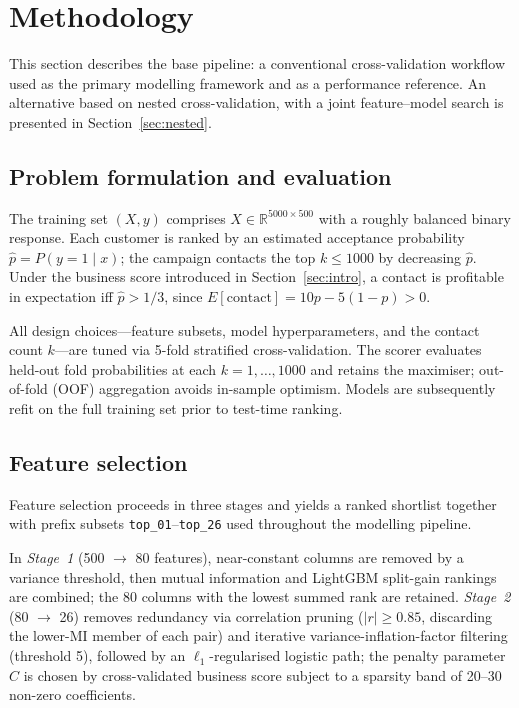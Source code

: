 \documentclass[cameraready]{Interspeech}
\begin{document}
\section{Methodology}

This section describes the base pipeline: a conventional cross-validation workflow used as the primary modelling framework and as a performance reference.
An alternative based on nested cross-validation, with a joint feature--model search is presented in Section~\ref{sec:nested}.

\subsection{Problem formulation and evaluation}
\label{sec:task}

The training set $(X, y)$ comprises $X \in \mathbb{R}^{5000 \times 500}$ with a roughly balanced binary response.
Each customer is ranked by an estimated acceptance probability $\hat{p} = P(y{=}1 \mid x)$; the campaign contacts the top $k \leq 1000$ by decreasing $\hat{p}$.
Under the business score introduced in Section~\ref{sec:intro}, a contact is profitable in expectation iff $\hat{p} > 1/3$, since $E[\text{contact}] = 10p - 5(1-p) > 0$.

All design choices---feature subsets, model hyperparameters, and the contact count $k$---are tuned via 5-fold stratified cross-validation.
The scorer evaluates held-out fold probabilities at each $k = 1, \ldots, 1000$ and retains the maximiser; out-of-fold (OOF) aggregation avoids in-sample optimism.
Models are subsequently refit on the full training set prior to test-time ranking.

\subsection{Feature selection}
\label{sec:featsel}

Feature selection proceeds in three stages and yields a ranked shortlist together with prefix subsets \texttt{top\_01}--\texttt{top\_26} used throughout the modelling pipeline.

In \emph{Stage~1} (500 $\to$ 80 features), near-constant columns are removed by a variance threshold, then mutual information and LightGBM split-gain rankings are combined; the 80 columns with the lowest summed rank are retained.
\emph{Stage~2} (80 $\to$ 26) removes redundancy via correlation pruning ($|r| \geq 0.85$, discarding the lower-MI member of each pair) and iterative variance-inflation-factor filtering (threshold 5), followed by an $\ell_1$-regularised logistic path; the penalty parameter $C$ is chosen by cross-validated business score subject to a sparsity band of 20--30 non-zero coefficients.
\end{document}
